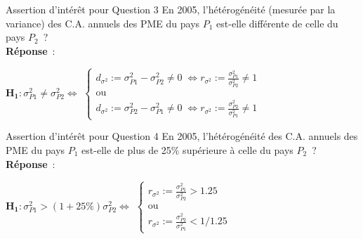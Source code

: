 \documentclass[11pt]{beamer}
\begin{document}
\begin{frame}
\frametitle{}

\begin{block}{Assertion d'intérêt pour Question 3}
En 2005, l'hétérogénéité (mesurée par la variance) des C.A. annuels des PME du pays $P_1$ est-elle différente de celle du pays $P_2$~?\\
\pause
\textbf{Réponse}~:
\centerline{$
\mathbf{H_1}: \!\sigma^2_{P1}\neq\sigma^2_{P2} \!\Longleftrightarrow\!$ \pause$ \left\{\begin{array}{c} d_{\sigma^2}:=\sigma^2_{P1}\!-\!\sigma^2_{P2} \neq 0 \; \Longleftrightarrow\! r_{\sigma^2}:=\frac{\sigma^2_{P1}}{\sigma^2_{P2}} \neq 1 \\\mbox{ou}\\d_{\sigma^2}:=\sigma^2_{P2}\!-\!\sigma^2_{P1} \neq 0 \; \Longleftrightarrow\! r_{\sigma^2}:=\frac{\sigma^2_{P2}}{\sigma^2_{P1}} \neq 1\end{array}\right.
$}
\end{block}

\begin{block}{Assertion d'intérêt pour Question 4}
En 2005, l'hétérogénéité des C.A. annuels des PME du pays $P_1$ est-elle de plus de 25\% supérieure à celle du pays $P_2$~?\\
\pause
\textbf{Réponse}~:
\centerline{$
\mathbf{H_1}: \!\sigma^2_{P1}\!>\!(1+25\%)\sigma^2_{P2} \!\Longleftrightarrow$  \pause $\left\{\begin{array}{c} \! r_{\sigma^2}:=\frac{\sigma^2_{P1}}{\sigma^2_{P2}} >1.25\\\mbox{ou}\\r_{\sigma^2}:=\frac{\sigma^2_{P2}}{\sigma^2_{P1}} < 1/1.25
\end{array}\right.
$}
\end{block}
\end{frame}
\end{document}
